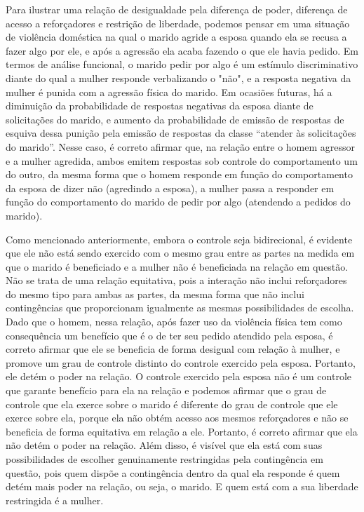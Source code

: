 Para ilustrar uma relação de desigualdade pela diferença de poder, diferença de acesso a reforçadores e restrição de liberdade, podemos pensar em uma situação de violência doméstica na qual o marido agride a esposa quando ela se recusa a fazer algo por ele, e após a agressão ela acaba fazendo o que ele havia pedido. Em termos de análise funcional, o marido pedir por algo é um estímulo discriminativo diante do qual a mulher responde verbalizando o "não", e a resposta negativa da mulher é punida com a agressão física do marido. Em ocasiões futuras, há a diminuição da probabilidade de respostas negativas da esposa diante de solicitações do marido, e aumento da probabilidade de emissão de respostas de esquiva dessa punição pela emissão de respostas da classe ``atender às solicitações do marido''. Nesse caso, é correto afirmar que, na relação entre o homem agressor e a mulher agredida, ambos emitem respostas sob controle do comportamento um do outro, da mesma forma que o homem responde em função do comportamento da esposa de dizer não (agredindo a esposa), a mulher passa a responder em função do comportamento do marido de pedir por algo (atendendo a pedidos do marido). 

Como mencionado anteriormente, embora o controle seja bidirecional, é evidente que ele não está sendo exercido com o mesmo grau entre as partes na medida em que o marido é beneficiado e a mulher não é beneficiada na relação em questão. Não se trata de uma relação equitativa, pois a interação não inclui reforçadores do mesmo tipo para ambas as partes, da mesma forma que não inclui contingências que proporcionam igualmente as mesmas possibilidades de escolha. Dado que o homem, nessa relação, após fazer uso da violência física tem como consequência um benefício que é o de ter seu pedido atendido pela esposa, é correto afirmar que ele se beneficia de forma desigual com relação à mulher, e promove um grau de controle distinto do controle exercido pela esposa. Portanto, ele detém o poder na relação. O controle exercido pela esposa não é um controle que garante benefício para ela na relação e podemos afirmar que o grau de controle que ela exerce sobre o marido é diferente do grau de controle que ele exerce sobre ela, porque ela não obtém acesso aos mesmos reforçadores e não se beneficia de forma equitativa em relação a ele. Portanto, é correto afirmar que ela não detém o poder na relação. Além disso, é visível que ela está com suas possibilidades de escolher genuinamente restringidas pela contingência em questão, pois quem dispõe a contingência dentro da qual ela responde é quem detém mais poder na relação, ou seja, o marido. E quem está com a sua liberdade restringida é a mulher.

